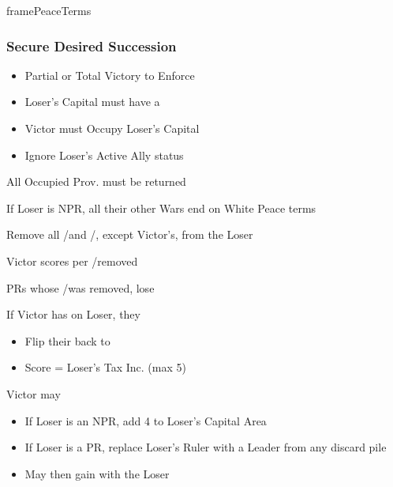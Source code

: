 \documentclass[10pt]{article}
\newlength{\fhPeaceTerms} \setlength\fhPeaceTerms{45.5\baselineskip}
\begin{document}
\begin{dynamiccontents*}{framePeaceTerms}
\begin{eubox}{\fhPeaceTerms}
\begin{multicols}{3}
		\subsubsection*{Secure Desired Succession }
		\begin{itemize}
			{
				\color{peaceReqColor}
				\item {}
				\begin{itemize}
					\item Partial or Total Victory to Enforce
					\item Loser's Capital must have a \disputedsuccession
					\item Victor must Occupy Loser's Capital
					\item Ignore Loser's Active Ally status
				\end{itemize}
			}
			\item All Occupied Prov. must be returned
			\item If Loser is NPR, all their other Wars end on White Peace terms
			\item Remove all \marriage/\disputedsuccession and \alliance/\activeally, except Victor's, from the Loser
			\item Victor scores  per \marriage/\disputedsuccession removed
			\item PRs whose \marriage/\disputedsuccession was removed, lose 
			\item If Victor has \disputedsuccession on Loser, they
			\begin{itemize}
				\item Flip their \disputedsuccession back to \marriage
				\item Score \prestige = Loser's Tax Inc. (max 5)
			\end{itemize}
			\item Victor may
			\begin{itemize}
				\item If Loser is an NPR, add 4 \influence to Loser's Capital Area
				\item If Loser is a PR, replace Loser's Ruler with a Leader from any discard pile
				\item May then gain \alliance with the Loser
			\end{itemize}
		\end{itemize}


\end{multicols}
\end{eubox}
\end{dynamiccontents*}
\end{document}
